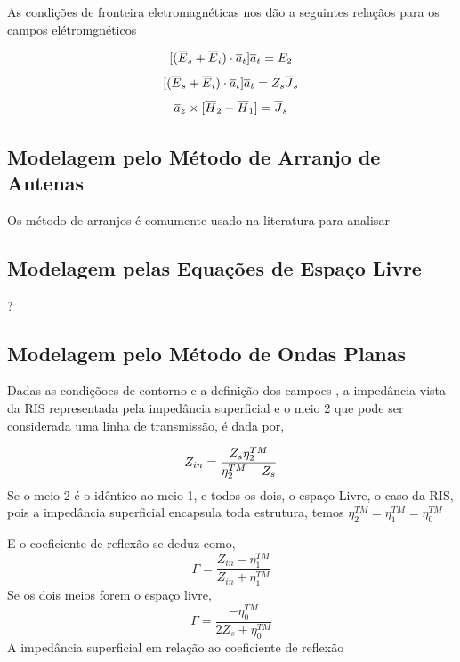\documentclass[
	12pt,				%
	openright,			%
	oneside,			%
	a4paper,			%
	english,			%
	brazil				%
	]{abntex2}
\begin{document}
As condições de fronteira eletromagnéticas nos dão a seguintes relaçãos para os campos elétromgnéticos

\begin{equation}{\label{BoundaryFields}}
 [(\overline{E}_s+\overline{E}_{i})\cdot \overline{a}_t]\overline{a}_t=E_2
\end{equation}
\begin{equation}{\label{BoundaryFieldsImp}}
 [(\overline{E}_s+\overline{E}_{i})\cdot \overline{a}_t]\overline{a}_t=Z_s\overline{J}_{s}
\end{equation}
\begin{equation}{\label{BoundaryCurrent}}
  \overline{a}_z  \times [{\overline{H}_{2}-\overline{H}_{1}} ]=\overline{J}_{s}
\end{equation}


\subsection{Modelagem pelo Método de Arranjo de Antenas}\label{FormulaçãoArrayBalanis}

Os método de arranjos é comumente usado na literatura para analisar


\subsection{Modelagem pelas Equações de Espaço Livre}\label{FormulaçãoFreeSpace
Balanis}
?
\subsection{Modelagem pelo Método de Ondas Planas}\label{FormulaçãoPWTLBalanis}

Dadas as condiçõoes de contorno e a definição dos campoes \cite{A}, a impedância vista da RIS representada pela impedância superficial e o meio 2 que pode ser considerada uma linha de transmissão, é dada por,

\begin{equation}{\label{ImpedanciaZinParaleloZsEta2}}
   Z_{in}= \frac{Z_s \eta_2^{TM} }{\eta_2^{TM}+Z_s}
\end{equation}
Se o meio 2 é o idêntico ao meio 1, e todos os dois, o espaço Livre, o caso da RIS, pois a impedância superficial encapsula toda estrutura, temos $\eta^{TM}_{2}=\eta^{TM}_1=\eta^{TM}_0$

E o coeficiente de reflexão se deduz como,
\begin{equation}
   \Gamma= \frac{Z_{in}-\eta_1^{TM}}
    {Z_{in}+\eta_1^{TM}}
\end{equation}
Se os dois meios forem o espaço livre,
\begin{equation}
    \Gamma=\frac{-\eta^{TM}_0}{2Z_s+\eta^{TM}_0}
\end{equation}
A impedância superficial em relação ao coeficiente de reflexão
\end{document}
